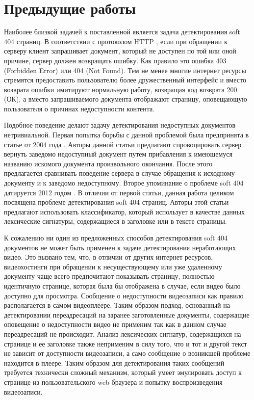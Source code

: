 \chapter{Предыдущие работы}

Наиболее близкой задачей к поставленной является задача детектирования soft 404 страниц. В соответствии с протоколом HTTP \cite{Fielding2014}, если при обращении к серверу клиент запрашивает документ, который не доступен по той или оной причине, сервер должен возвращать ошибку. Как правило это ошибка 403 (Forbidden Error) или 404 (Not Found). Тем не менее многие интернет ресурсы стремятся предоставить пользователю более дружественный интерфейс и вместо возврата ошибки имитируют нормальную работу, возвращая код возврата 200 (ОК), а вместо запрашиваемого документа отображают страницу, оповещающую пользователя о причинах недоступности контента.

Подобное поведение делают задачу детектирования недоступных документов нетривиальной. Первая попытка борьбы с данной проблемой была предпринята в статье от 2004 года \cite{Bar-Yossef2004}. Авторы данной статьи предлагают спровоцировать сервер вернуть заведомо недоступный документ путем прибавления к имеющемуся названию искомого документа произвольного окончания. После этого предлагается сравнивать поведение сервера в случае обращения к исходному документу и к заведомо недоступному. Второе упоминание о проблеме soft 404 датируется 2012 годом \cite{Meneses2012}. В отличии от первой статьи, данная работа целиком посвящена проблеме детектирования soft 404 страниц. Авторы этой статьи предлагают использовать классификатор, который использует в качестве данных лексические сигнатуры, содержащиеся в заголовке или в тексте страницы.

К сожалению ни один из предложенных способов детектирования soft 404 документов не может быть применен к задаче детектирования неработающих видео. Это вызвано тем, что, в отличии от других интернет ресурсов, видеохостинги при обращении к несуществующему или уже удаленному документу чаще всего предпочитают показывать страницу, полностью идентичную странице, которая была бы отображена в случае, если видео было доступно для просмотра. Сообщение о недоступности видеозаписи как правило располагается в самом видеоплеере. Таким образом подход, основанный на детектировании переадресаций на заранее заготовленные документы, содержащие оповещение о недоступности видео не применим так как в данном случае переадресаций не происходит. Анализ лексических сигнатур, содержащихся на странице и ее заголовке также неприменим в силу того, что и тот и другой текст не зависит от доступности видеозаписи, а само сообщение о возникшей проблеме находится в плеере. Таким образом для детектирования таких сообщений требуется технически сложный механизм, который умеет эмулировать доступ к странице из пользовательского web браузера и попытку воспроизведения видеозаписи.